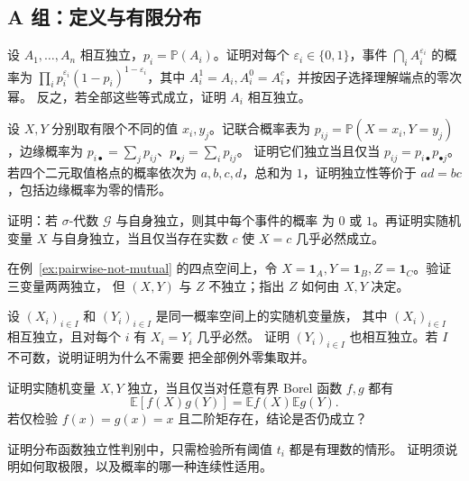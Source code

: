 \subsection*{A 组：定义与有限分布}
\begin{enumerate}[label=\textbf{\thechapter.\arabic*.}]
设 $A_1,\ldots,A_n$ 相互独立，$p_i=\mathbb P(A_i)$。证明对每个
$\varepsilon_i\in\{0,1\}$，事件
$\bigcap_i A_i^{\varepsilon_i}$ 的概率为
$\prod_i p_i^{\varepsilon_i}(1-p_i)^{1-\varepsilon_i}$，其中
$A_i^1=A_i,A_i^0=A_i^c$，并按因子选择理解端点的零次幂。
反之，若全部这些等式成立，证明 $A_i$ 相互独立。

设 $X,Y$ 分别取有限个不同的值 $x_i,y_j$。记联合概率表为
$p_{ij}=\mathbb P(X=x_i,Y=y_j)$，边缘概率为
$p_{i\bullet}=\sum_jp_{ij}$、$p_{\bullet j}=\sum_ip_{ij}$。
证明它们独立当且仅当 $p_{ij}=p_{i\bullet}p_{\bullet j}$。
若四个二元取值格点的概率依次为 $a,b,c,d$，总和为 $1$，证明独立性等价于
$ad=bc$，包括边缘概率为零的情形。

证明：若 $\sigma$-代数 $\mathcal G$ 与自身独立，则其中每个事件的概率
为 $0$ 或 $1$。再证明实随机变量 $X$ 与自身独立，当且仅当存在实数 $c$
使 $X=c$ 几乎必然成立。

在例~\ref{ex:pairwise-not-mutual} 的四点空间上，令
$X=\mathbf 1_A,Y=\mathbf 1_B,Z=\mathbf 1_C$。验证三变量两两独立，
但 $(X,Y)$ 与 $Z$ 不独立；指出 $Z$ 如何由 $X,Y$ 决定。

设 $(X_i)_{i\in I}$ 和 $(Y_i)_{i\in I}$ 是同一概率空间上的实随机变量族，
其中 $(X_i)_{i\in I}$ 相互独立，且对每个 $i$ 有 $X_i=Y_i$ 几乎必然。
证明 $(Y_i)_{i\in I}$ 也相互独立。若 $I$ 不可数，说明证明为什么不需要
把全部例外零集取并。

证明实随机变量 $X,Y$ 独立，当且仅当对任意有界 Borel 函数 $f,g$ 都有
\[
 \mathbb E[f(X)g(Y)]=\mathbb E f(X)\mathbb E g(Y).
\]
若仅检验 $f(x)=g(x)=x$ 且二阶矩存在，结论是否仍成立？

证明分布函数独立性判别中，只需检验所有阈值 $t_i$ 都是有理数的情形。
证明须说明如何取极限，以及概率的哪一种连续性适用。
\end{enumerate}

